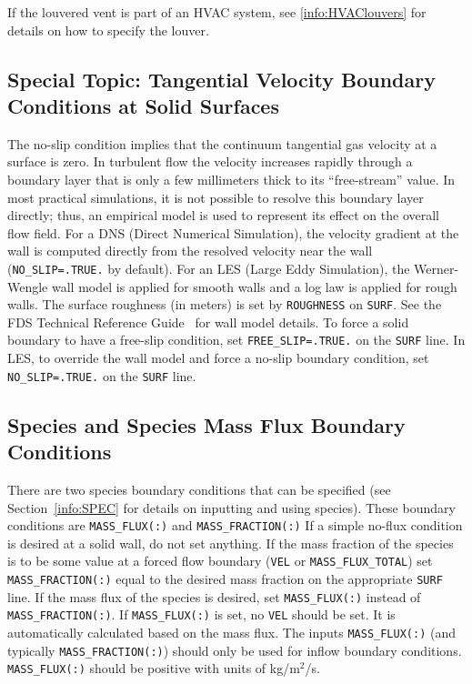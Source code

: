 \documentclass[11pt]{book}
\newcommand{\ct}{\tt\small}
\begin{document}
If the louvered vent is part of an HVAC system, see \ref{info:HVAClouvers} for details on how to specify the louver.

\subsection{Special Topic: Tangential Velocity Boundary Conditions at Solid Surfaces}
\label{info:WALL_MODEL}

The no-slip condition implies that the continuum tangential gas velocity at a surface is zero.
In turbulent flow the velocity increases rapidly through a boundary layer that is only a few millimeters thick to its ``free-stream'' value.
In most practical simulations, it is not possible to resolve this boundary layer directly; thus, an empirical model is used to represent its effect on the overall flow field.
For a DNS (Direct Numerical Simulation), the velocity gradient at the wall is computed directly from the resolved velocity near the wall ({\ct NO\_SLIP=.TRUE.} by default).
For an LES (Large Eddy Simulation), the Werner-Wengle wall model is applied for smooth walls and a log law is applied for rough walls.
The surface roughness (in meters) is set by {\ct ROUGHNESS} on {\ct SURF}. See the FDS Technical Reference Guide~\cite{FDS_Math_Guide} for wall model details.
To force a solid boundary to have a free-slip condition, set {\ct FREE\_SLIP=.TRUE.} on the {\ct SURF} line.
In LES, to override the wall model and force a no-slip boundary condition, set {\ct NO\_SLIP=.TRUE.} on the {\ct SURF} line.


\subsection{Species and Species Mass Flux Boundary Conditions}

\label{info:MASS_FLUX}

There are two species boundary conditions that can be specified
(see Section~\ref{info:SPEC} for details on inputting and using species).
These boundary conditions are {\ct MASS\_FLUX(:)} and {\ct MASS\_FRACTION(:)}
If a simple no-flux condition is desired at a solid wall, do not set
anything. If the mass fraction of the species is to be some
value at a forced flow boundary ({\ct VEL} or {\ct MASS\_FLUX\_TOTAL}) set
{\ct MASS\_FRACTION(:)} equal to the desired mass fraction on the appropriate
{\ct SURF} line.
If the mass flux of the species is desired, set
{\ct MASS\_FLUX(:)} instead of {\ct MASS\_FRACTION(:)}.
If {\ct MASS\_FLUX(:)}
is set, no {\ct VEL} should be set. It is automatically
calculated based on the mass flux.
The inputs {\ct MASS\_FLUX(:)} (and typically {\ct MASS\_FRACTION(:)}) should only be used
for inflow boundary conditions.  {\ct MASS\_FLUX(:)} should be positive with
units of kg/m$^2$/s.
\end{document}
